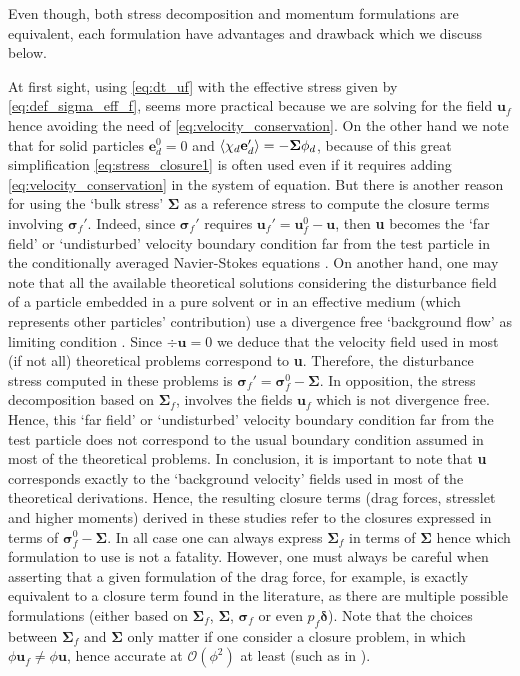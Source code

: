 Even though, both stress decomposition and momentum formulations are equivalent, each formulation have advantages and drawback which we discuss below.  

At first sight, using \ref{eq:dt_uf} with the effective stress given by \ref{eq:def_sigma_eff_f}, seems more practical because we are solving for the field $\textbf{u}_f$ hence avoiding the need of \ref{eq:velocity_conservation}. 
On the other hand we note that for solid particles $\textbf{e}_d^0 = 0$ and $\left<\chi_d \textbf{e}_d'\right> = -\bm\Sigma\phi_d$, because of this great simplification \ref{eq:stress_closure1} is often used \citep{jackson2000} even if it requires adding \ref{eq:velocity_conservation} in the system of equation.  
But there is another reason for using the `bulk stress' $\bm\Sigma$ as a reference stress to compute the closure terms involving $\bm\sigma_f'$. 
Indeed, since $\bm\sigma_f'$ requires $\textbf{u}_f' = \textbf{u}_f^0 - \textbf{u}$, then \textbf{u} becomes the `far field' or `undisturbed' velocity boundary condition far from the test particle in the conditionally averaged Navier-Stokes equations .
On another hand, one may note that all the available theoretical solutions considering the disturbance field of a particle embedded in a pure solvent or in an effective medium (which represents other particles' contribution) use a divergence free `background flow' as limiting condition \citep{kim1985modelling,hinch1977averaged}.
Since $\div \textbf{u} =0$ we deduce that the velocity field used in most (if not all) theoretical problems correspond to \textbf{u}. 
Therefore, the disturbance  stress computed in these problems is $\bm\sigma_f'= \bm\sigma_f^0 - \bm\Sigma$. 
In opposition, the stress decomposition based on $\bm\Sigma_f$, involves the fields $\textbf{u}_f$ which is not divergence free. 
Hence, this `far field' or `undisturbed' velocity boundary condition far from the test particle does not correspond to the usual boundary condition assumed in most of the theoretical problems. 
In conclusion, it is important to note that \textbf{u} corresponds exactly to the `background velocity' fields used in most of the theoretical derivations.
Hence, the resulting closure terms (drag forces, stresslet and higher moments) derived in these studies refer to the closures expressed in terms of $\bm\sigma_f^0 - \bm\Sigma$.
In all case one can always express $\bm\Sigma_f$ in terms of $\bm\Sigma$ hence which formulation to use is not a fatality. 
However, one must always be careful when asserting that a given formulation of the drag force, for example, is exactly equivalent to a closure term found in the literature, as there are multiple possible formulations  (either based on $\bm\Sigma_f$, $\bm\Sigma$, $\bm\sigma_f$ or even  $p_f \bm\delta$). 
Note that the choices between $\bm\Sigma_f$ and $\bm\Sigma$ only matter if one consider a closure problem, in which $\phi \textbf{u}_f \neq \phi \textbf{u}$, hence accurate at $\mathcal{O}(\phi^2)$ at least (such as in \citet{hinch1977averaged,kim1985modelling}). 


